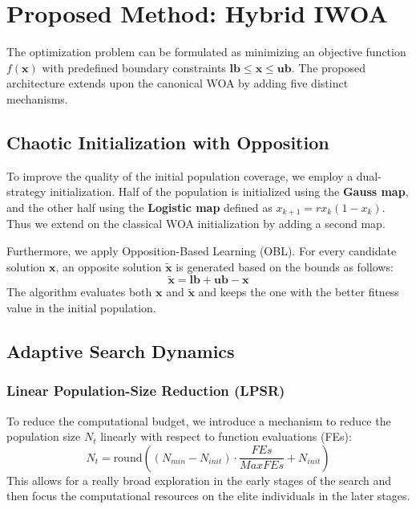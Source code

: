 \documentclass[conference]{IEEEtran}
\begin{document}
\section{Proposed Method: Hybrid IWOA}
\label{sec:method}

The optimization problem can be formulated as minimizing an objective function $f(\mathbf{x})$ with predefined boundary constraints $\mathbf{lb} \leq \mathbf{x} \leq \mathbf{ub}$. The proposed architecture extends upon the canonical WOA by adding five distinct mechanisms.

\subsection{Chaotic Initialization with Opposition}
To improve the quality of the initial population coverage, we employ a dual-strategy initialization. Half of the population is initialized using the \textbf{Gauss map}, and the other half using the \textbf{Logistic map} defined as $x_{k+1} = r x_k(1-x_k)$. Thus we extend on the classical WOA initialization by adding a second map.

Furthermore, we apply Opposition-Based Learning (OBL). For every candidate solution $\mathbf{x}$, an opposite solution $\tilde{\mathbf{x}}$ is generated based on the bounds as follows:
\begin{equation}
    \tilde{\mathbf{x}} = \mathbf{lb} + \mathbf{ub} - \mathbf{x}
\end{equation}
The algorithm evaluates both $\mathbf{x}$ and $\tilde{\mathbf{x}}$ and keeps the one with the better fitness value in the initial population.

\subsection{Adaptive Search Dynamics}
\subsubsection{Linear Population-Size Reduction (LPSR)}
To reduce the computational budget, we introduce a mechanism to reduce the population size $N_t$ linearly with respect to function evaluations (FEs):
\begin{equation}
    N_t = \text{round}\left( (N_{min} - N_{init}) \cdot \frac{FEs}{MaxFEs} + N_{init} \right)
\end{equation}
This allows for a really broad exploration in the early stages of the search and then focus the computational resources on the elite individuals in the later stages.
\end{document}
